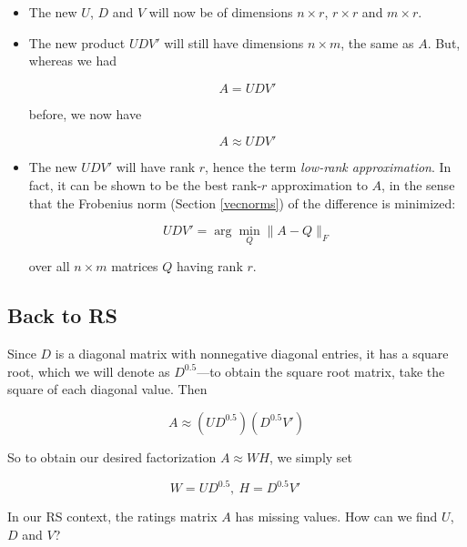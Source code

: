 \begin{itemize}

\item The new $U$, $D$ and $V$ will now be of dimensions
$n \times r$, $r \times r$ and $m \times r$.

\item The new product $UDV'$ will still have dimensions $n \times m$,
the same as $A$.  But, whereas we had

\begin{equation}
A = UDV'
\end{equation}

before, we now have

\begin{equation}
A \approx UDV'
\end{equation}

\item The new $UDV'$ will have rank $r$, hence the term
\textit{low-rank approximation}.  In fact, it can be shown to be the
best rank-$r$ approximation to $A$, in the sense that the Frobenius norm
(Section \ref{vecnorms}) of the difference is minimized:

\begin{equation}
\label{bestlow}
UDV' = \arg \min_Q \| A - Q\|_{F}
\end{equation}

over all $n \times m$ matrices $Q$ having rank $r$.

\end{itemize} 

\subsection{Back to RS}

Since $D$ is a diagonal matrix with nonnegative diagonal entries, it has
a square root, which we will denote as $D^{0.5}$---to obtain the square
root matrix, take the square of each diagonal value.  Then

\begin{equation}
A \approx (UD^{0.5}) (D^{0.5} V')
\end{equation}

So to obtain our desired factorization $A \approx WH$, we simply set

\begin{equation}
W = UD^{0.5}, ~ H = D^{0.5}V' ~ 
\end{equation}

In our RS context, the ratings matrix $A$ has missing values.  How can
we find $U$, $D$ and $V$?  

